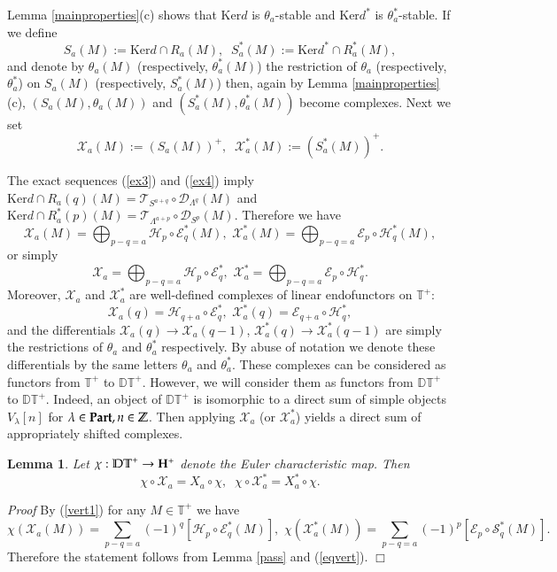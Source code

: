 \documentclass[11pt]{amsart}
\newcounter{theorem}
\newtheorem{lemma}[theo]{Lemma}
\renewenvironment{proof}{ \emph{Proof}}{$\Box$}
\newcommand{\TT}{\mathbb{T}}
\newcommand{\Ker}{\mathrm{Ker}}
\begin{document}
Lemma \ref{mainproperties}(c) shows that $\Ker d$ is 
$\theta_a$-stable and  $\Ker d^*$ is $\theta_a^*$-stable. If we define
$$S_a(M):=\Ker d\cap R_a(M),\;\;S_a^*(M):=\Ker d^*\cap R_a^*(M),$$ 
and denote by $\theta_a(M)$ (respectively, $\theta_a^*(M)$) the restriction of
$\theta_a$ (respectively, $\theta_a^*$) on $S_a(M)$ (respectively, $S_a^*(M)$) then, again by  Lemma \ref{mainproperties}(c),
$(S_a(M),\theta_a(M))$  and $(S^*_a(M),\theta_a^*(M))$ become complexes. Next we set
$$\mathcal X_a(M):=(S_a(M))^+,\;\;\mathcal X_a^*(M):=(S_a^*(M))^+.$$


The exact sequences (\ref{ex3}) and (\ref{ex4}) imply $\Ker d\cap R_a(q)(M)=\mathcal T_{S^{a+q}}\circ \mathcal D_{\Lambda^{q}}(M)$ 
and $\Ker d\cap R^*_a(p)(M)=\mathcal T_{\Lambda^{a+p}}\circ \mathcal D_{S^{p}}(M)$. Therefore we have
\begin{equation}\label{vert1}
\mathcal X_a(M)=\bigoplus_{p-q=a} \mathcal H_p\circ\mathcal E^*_q(M),\,\,\mathcal X^*_a(M)=\bigoplus_{p-q=a} \mathcal E_p\circ\mathcal H^*_q(M),
\end{equation}
or simply
\begin{equation}\label{vert2}
\mathcal X_a=\bigoplus_{p-q=a} \mathcal H_p\circ\mathcal E^*_q,\,\,\mathcal X^*_a=\bigoplus_{p-q=a} \mathcal E_p\circ\mathcal H^*_q.\nonumber
\end{equation}
Moreover, $\mathcal X_a$ and $\mathcal X_a^*$ are well-defined complexes of linear endofunctors on $\mathbb T^+$: 
\begin{equation}
\mathcal X_a(q)=\mathcal H_{q+a}\circ\mathcal E^*_q,\,\,\mathcal X^*_a(q)=\mathcal E_{q+a}\circ\mathcal H^*_q,\nonumber
\end{equation}
and the differentials $\mathcal X_a(q)\to\mathcal X_a(q-1)$, $\mathcal X^*_a(q)\to\mathcal X^*_a(q-1)$ are simply the restrictions of $\theta_a$ and $\theta^*_a$
respectively. By abuse of notation we denote these differentials by the same letters $\theta_a$ and $\theta_a^*$.
These complexes can be considered as functors from $\TT^+$ to $\mathbb{DT}^+$. However, we will consider them as functors from  $\mathbb{DT}^+$ to $\mathbb{DT}^+$.
Indeed, an object of $\mathbb{DT}^+$ is isomorphic to a direct sum of simple objects $V_\lambda[n]$ for $\lambda\in\bold{Part},n\in\mathbb Z$. Then
applying $\mathcal X_a$ (or $\mathcal X^*_a$) yields a direct sum of appropriately shifted complexes. 

\begin{lemma}\label{clif1}  Let $\chi: \mathbb{DT}^+\to \bold{H}^+$
denote the Euler characteristic map. Then
$$\chi\circ\mathcal X_a=X_a\circ\chi,\;\;\chi\circ\mathcal X_a^*=X^*_a\circ\chi.$$
\end{lemma}
\begin{proof} By (\ref{vert1}) for any $M\in \TT^+$ we have 
$$\chi(\mathcal X_a(M))=\sum_{p-q=a}(-1)^q [\mathcal H_p\circ\mathcal E^*_q(M)], \,\,\chi(\mathcal X^*_a(M))=\sum_{p-q=a} (-1)^p [\mathcal E_p\circ\mathcal S^*_q(M)].$$
Therefore the statement follows from Lemma \ref{pass} and (\ref{eqvert}).
\end{proof}
\end{document}
